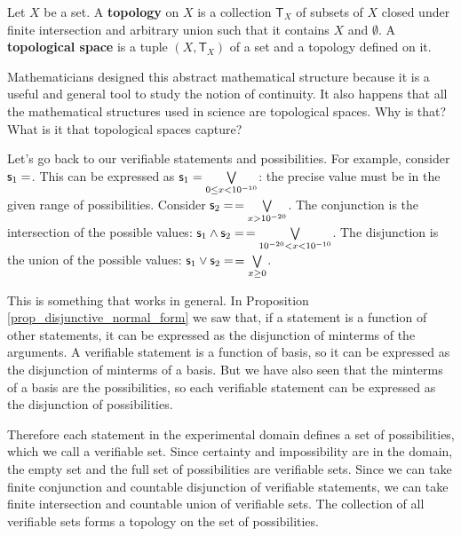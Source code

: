 \documentclass[11pt,letterpaper,fleqn]{memoir} %
\begin{document}
\begin{mathSection}
	\begin{defn}
		Let $X$ be a set. A \textbf{topology} on $X$ is a collection $\mathsf{T}_X$ of subsets of $X$ closed under finite intersection and arbitrary union such that it contains $X$ and $\emptyset$. A \textbf{topological space} is a tuple $(X, \mathsf{T}_X)$ of a set and a topology defined on it.
	\end{defn}
\end{mathSection}

Mathematicians designed this abstract mathematical structure because it is a useful and general tool to study the notion of continuity. It also happens that all the mathematical structures used in science are topological spaces. Why is that? What is it that topological spaces capture?

Let's go back to our verifiable statements and possibilities. For example, consider $\mathsf{s}_1=$. This can be expressed as $\mathsf{s}_1=\bigvee\limits_{0\leq x<10^{-10}}$: the precise value must be in the given range of possibilities. Consider $\mathsf{s}_2=$$=\bigvee\limits_{x>10^{-20}}$. The conjunction is the intersection of the possible values: $\mathsf{s}_1\wedge\mathsf{s}_2=$$=\bigvee\limits_{10^{-20}< x<10^{-10}}$. The disjunction is the union of the possible values: $\mathsf{s}_1\vee\mathsf{s}_2=$$=\bigvee\limits_{x\geq0}$.

This is something that works in general. In Proposition \ref{prop_disjunctive_normal_form} we saw that, if a statement is a function of other statements, it can be expressed as the disjunction of minterms of the arguments. A verifiable statement is a function of basis, so it can be expressed as the disjunction of minterms of a basis. But we have also seen that the minterms of a basis are the possibilities, so each verifiable statement can be expressed as the disjunction of possibilities.


Therefore each statement in the experimental domain defines a set of possibilities, which we call a verifiable set. Since certainty and impossibility are in the domain, the empty set and the full set of possibilities are verifiable sets. Since we can take finite conjunction and countable disjunction of verifiable statements, we can take finite intersection and countable union of verifiable sets. The collection of all verifiable sets forms a topology on the set of possibilities.
\end{document}
